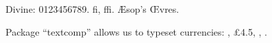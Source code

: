 \documentclass{article}
\begin{document}
\divinefamily

Divine: 0123456789. fi, ffi. \AE sop's \OE vres. \kant[1]



Package ``textcomp'' allows us to typeset currencies: ,
\pounds4.5, , .
\end{document}
